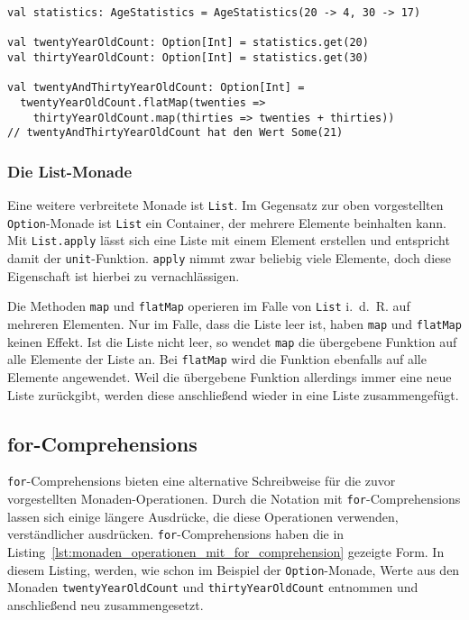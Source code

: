 \begin{lstlisting}[caption=Die Option-Monade, label=lst:die_option_monade]
val statistics: AgeStatistics = AgeStatistics(20 -> 4, 30 -> 17)

val twentyYearOldCount: Option[Int] = statistics.get(20)
val thirtyYearOldCount: Option[Int] = statistics.get(30)

val twentyAndThirtyYearOldCount: Option[Int] =
  twentyYearOldCount.flatMap(twenties =>
    thirtyYearOldCount.map(thirties => twenties + thirties))
// twentyAndThirtyYearOldCount hat den Wert Some(21)
\end{lstlisting}


\subsubsection{Die List-Monade} %
\label{ssub:die_list_monade}

Eine weitere verbreitete Monade ist \lstinline|List|.
Im Gegensatz zur oben vorgestellten \lstinline|Option|-Monade ist \lstinline|List| ein Container, der mehrere Elemente beinhalten kann.
Mit \lstinline|List.apply| lässt sich eine Liste mit einem Element erstellen und entspricht damit der \lstinline|unit|-Funktion.
\lstinline|apply| nimmt zwar beliebig viele Elemente, doch diese Eigenschaft ist hierbei zu vernachlässigen.

Die Methoden \lstinline|map| und \lstinline|flatMap| operieren im Falle von \lstinline|List| i.~d.~R. auf mehreren Elementen.
Nur im Falle, dass die Liste leer ist, haben \lstinline|map| und \lstinline|flatMap| keinen Effekt.
Ist die Liste nicht leer, so wendet \lstinline|map| die übergebene Funktion auf alle Elemente der Liste an.
Bei \lstinline|flatMap| wird die Funktion ebenfalls auf alle Elemente angewendet.
Weil die übergebene Funktion allerdings immer eine neue Liste zurückgibt, werden diese anschließend wieder in eine Liste zusammengefügt.



\subsection{for-Comprehensions} %
\label{sub:for_comprehensions}

\lstinline|for|-Comprehensions bieten eine alternative Schreibweise für die zuvor vorgestellten Monaden-Operationen.
Durch die Notation mit \lstinline|for|-Comprehensions lassen sich einige längere Ausdrücke, die diese Operationen verwenden, verständlicher ausdrücken.
\lstinline|for|-Comprehensions haben die in Listing~\ref{lst:monaden_operationen_mit_for_comprehension} gezeigte Form.
In diesem Listing, werden, wie schon im Beispiel der \lstinline|Option|-Monade, Werte aus den Monaden \lstinline|twentyYearOldCount| und \lstinline|thirtyYearOldCount| entnommen und anschließend neu zusammengesetzt.

